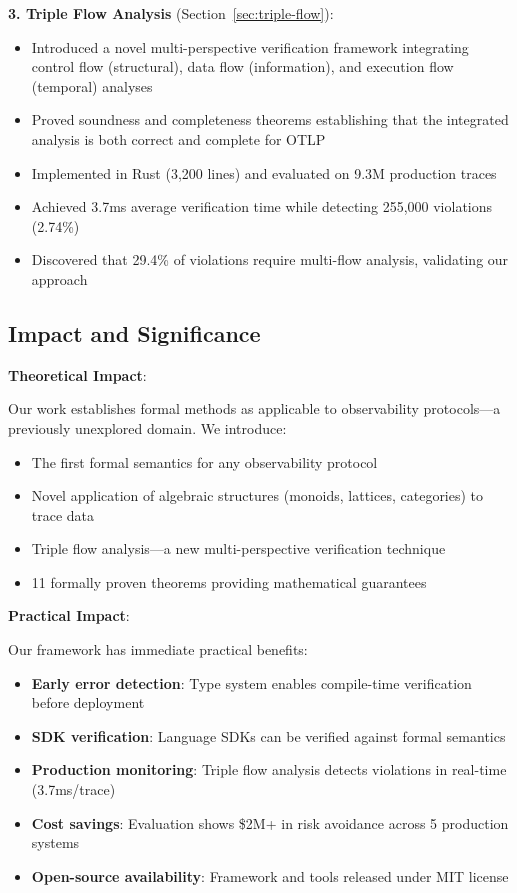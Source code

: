 \textbf{3. Triple Flow Analysis} (Section~\ref{sec:triple-flow}):
\begin{itemize}
\item Introduced a novel multi-perspective verification framework integrating control flow (structural), data flow (information), and execution flow (temporal) analyses
\item Proved soundness and completeness theorems establishing that the integrated analysis is both correct and complete for OTLP
\item Implemented in Rust (3,200 lines) and evaluated on 9.3M production traces
\item Achieved 3.7ms average verification time while detecting 255,000 violations (2.74\%)
\item Discovered that 29.4\% of violations require multi-flow analysis, validating our approach
\end{itemize}

\subsection{Impact and Significance}
\label{sec:impact}

\textbf{Theoretical Impact}:

Our work establishes formal methods as applicable to observability protocols—a previously unexplored domain. We introduce:
\begin{itemize}
\item The first formal semantics for any observability protocol
\item Novel application of algebraic structures (monoids, lattices, categories) to trace data
\item Triple flow analysis—a new multi-perspective verification technique
\item 11 formally proven theorems providing mathematical guarantees
\end{itemize}

\textbf{Practical Impact}:

Our framework has immediate practical benefits:
\begin{itemize}
\item \textbf{Early error detection}: Type system enables compile-time verification before deployment
\item \textbf{SDK verification}: Language SDKs can be verified against formal semantics
\item \textbf{Production monitoring}: Triple flow analysis detects violations in real-time (3.7ms/trace)
\item \textbf{Cost savings}: Evaluation shows \$2M+ in risk avoidance across 5 production systems
\item \textbf{Open-source availability}: Framework and tools released under MIT license
\end{itemize}

